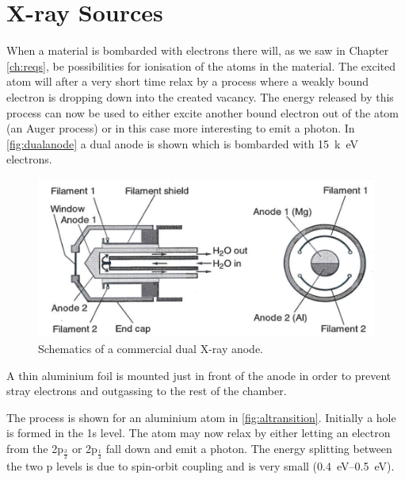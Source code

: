 \section{X-ray Sources}
When a material is bombarded with electrons there will, as we saw in Chapter \ref{ch:reqs}, be possibilities for ionisation of the atoms in the material. The excited atom will after a very short time relax by a process where a weakly bound electron is dropping down into the created vacancy. The energy released by this process can now be used to either excite another bound electron out of the atom (an Auger process) or in this case more interesting to emit a photon. In \autoref{fig:dualanode} a dual anode is shown which is bombarded with \SI{15}{k\electronvolt} electrons.

\begin{figure}[h!]
	\begin{center}
	\includegraphics[scale=3]{figures/04_02.png}
	\caption{Schematics of a commercial dual
          X-ray anode.}
	\label{fig:dualanode}
	\end{center}
\end{figure}

A thin aluminium foil is mounted just in front of the anode in order to prevent stray electrons and outgassing to the rest of the chamber.

The process is shown for an aluminium atom in \autoref{fig:altransition}. Initially a hole is formed in the 1s level. The atom may now relax by either letting an electron  from the 2p$_{\frac{3}{2}}$ or 2p$_{\frac{1}{2}}$ fall down and emit a photon. The energy splitting between the two p levels  is due to spin-orbit coupling and is very small (\SIrange{0.4}{0.5}{\electronvolt}).


